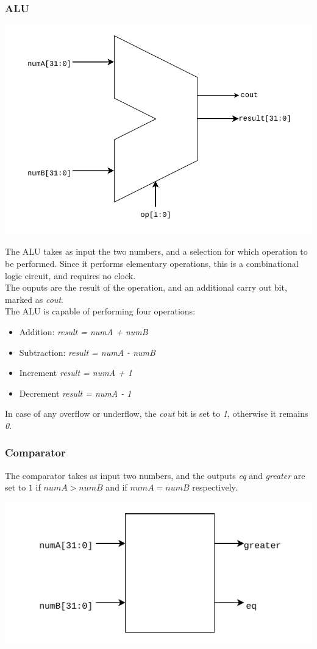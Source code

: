 \documentclass[a4paper,10pt]{article}
\begin{document}
    \subsubsection{ALU}
    \centerline{\includegraphics[scale=0.75]{adderALU.pdf}}
    The ALU takes as input the two numbers, and a selection for which operation to be performed. Since it performs elementary operations, this is a combinational logic circuit, and requires no clock.\\
    The ouputs are the result of the operation, and an additional carry out bit, marked as \textit{cout}.\\
    The ALU is capable of performing four operations:
    \begin{itemize}
     \item Addition: \textit{result = numA + numB}
     \item Subtraction: \textit{result = numA - numB}
     \item Increment \textit{result = numA + 1}
     \item Decrement \textit{result = numA - 1}
    \end{itemize}
    In case of any overflow or underflow, the \textit{cout} bit is set to \textit{1}, otherwise it remains \textit{0}.\\
    \newpage
    \subsubsection{Comparator}
    The comparator takes as input two numbers, and the outputs \textit{eq} and \textit{greater} are set to $1$ if $numA > numB$ and if $numA = numB$ respectively.\\
    \centerline{\includegraphics{comparator.pdf}}
\end{document}

